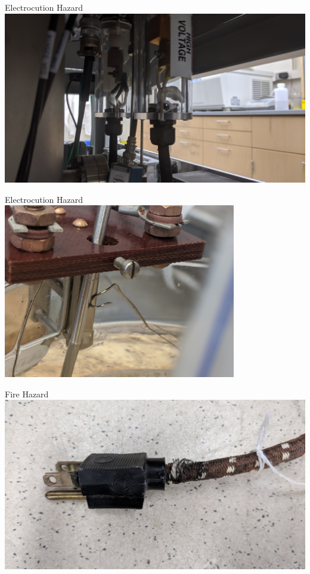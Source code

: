 \documentclass{presentation}
\begin{document}
\begin{frame}{Electrocution Hazard}
  \centering
  \includegraphics[width=\textwidth]{"./IMG_20191001_140050.jpg"}
\end{frame}

\begin{frame}{Electrocution Hazard}
  \centering
  \includegraphics[height=3in]{"./IMG_20200904_131436.jpg"}
\end{frame}

\begin{frame}{Fire Hazard}
  \includegraphics[width=\textwidth]{"./IMG_20181009_153609.jpg"}
\end{frame}
\end{document}
